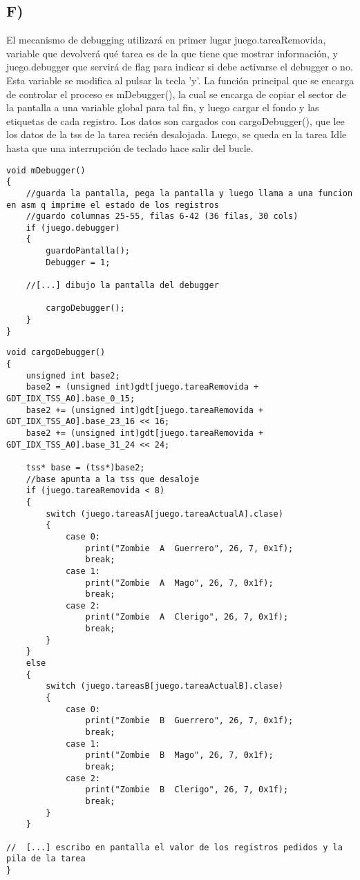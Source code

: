 \subsection*{F)} El mecanismo de debugging utilizar\'a en primer lugar juego.tareaRemovida, variable que devolver\'a qu\'e tarea es de la que tiene que mostrar informaci\'on, 
y juego.debugger que servir\'a de flag para indicar si debe activarse el debugger o no. Esta variable se modifica al pulsar la tecla 'y'.
La funci\'on principal que se encarga de controlar el proceso es mDebugger(), la cual se encarga de copiar el sector de la pantalla a una variable global para tal fin, y luego 
cargar el fondo y las etiquetas de cada registro.
Los datos son cargados con cargoDebugger(), que lee los datos de la tss de la tarea reci\'en desalojada. Luego, se queda en la tarea Idle hasta que una 
interrupci\'on de teclado hace salir del bucle. 
\begin{codesnippet}
\begin{verbatim}
void mDebugger()
{
	//guarda la pantalla, pega la pantalla y luego llama a una funcion en asm q imprime el estado de los registros
	//guardo columnas 25-55, filas 6-42 (36 filas, 30 cols)
	if (juego.debugger)
	{
		guardoPantalla();
		Debugger = 1;

	//[...] dibujo la pantalla del debugger
		
		cargoDebugger();
	}
}
\end{verbatim}
\end{codesnippet}

\begin{codesnippet}
\begin{verbatim}
void cargoDebugger()
{
	unsigned int base2;
	base2 = (unsigned int)gdt[juego.tareaRemovida + GDT_IDX_TSS_A0].base_0_15;
	base2 += (unsigned int)gdt[juego.tareaRemovida + GDT_IDX_TSS_A0].base_23_16 << 16;
	base2 += (unsigned int)gdt[juego.tareaRemovida + GDT_IDX_TSS_A0].base_31_24 << 24;

	tss* base = (tss*)base2;
	//base apunta a la tss que desaloje
	if (juego.tareaRemovida < 8)
	{
		switch (juego.tareasA[juego.tareaActualA].clase)
		{
			case 0:
				print("Zombie  A  Guerrero", 26, 7, 0x1f);
				break;			
			case 1:
				print("Zombie  A  Mago", 26, 7, 0x1f);
				break;			
			case 2:
				print("Zombie  A  Clerigo", 26, 7, 0x1f);
				break;			
		}
	}
	else
	{
		switch (juego.tareasB[juego.tareaActualB].clase)
		{
			case 0:
				print("Zombie  B  Guerrero", 26, 7, 0x1f);
				break;			
			case 1:
				print("Zombie  B  Mago", 26, 7, 0x1f);
				break;			
			case 2:
				print("Zombie  B  Clerigo", 26, 7, 0x1f);
				break;			
		}
	}
	
//	[...] escribo en pantalla el valor de los registros pedidos y la pila de la tarea
}
\end{verbatim}
\end{codesnippet}

